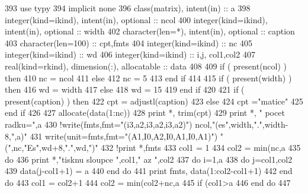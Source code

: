 \begin{DoxyCode}
393         \textcolor{keywordtype}{use }typy
394         \textcolor{keywordtype}{implicit none}
396         \textcolor{keywordtype}{class}(matrix), \textcolor{keywordtype}{intent(in)} :: a
398         \textcolor{keywordtype}{integer(kind=ikind)}, \textcolor{keywordtype}{intent(in)}, \textcolor{keywordtype}{optional} :: ncol
400         \textcolor{keywordtype}{integer(kind=ikind)}, \textcolor{keywordtype}{intent(in)}, \textcolor{keywordtype}{optional} :: width
402         \textcolor{keywordtype}{character(len=*)}, \textcolor{keywordtype}{intent(in)},    \textcolor{keywordtype}{optional} :: caption
403         \textcolor{keywordtype}{character(len=100)} :: cpt,fmts
404         \textcolor{keywordtype}{integer(kind=ikind)} :: nc
405         \textcolor{keywordtype}{integer(kind=ikind)} :: wd
406         \textcolor{keywordtype}{integer(kind=ikind)} :: i,j, col1,col2
407         \textcolor{keywordtype}{real(kind=rkind)}, \textcolor{keywordtype}{dimension(:)}, \textcolor{keywordtype}{allocatable} :: data
408 
409         \textcolor{keywordflow}{if} ( \textcolor{keyword}{present}(ncol) ) then
410         nc = ncol
411         else
412             nc = 5
413 \textcolor{keyword}{        end }if
414 
415         \textcolor{keywordflow}{if} ( \textcolor{keyword}{present}(width) ) then
416         wd = width
417         else
418             wd = 15
419 \textcolor{keyword}{        end }if
420 
421         \textcolor{keywordflow}{if} ( \textcolor{keyword}{present}(caption) ) then
422         cpt = adjustl(caption)
423         else
424             cpt =\textcolor{stringliteral}{"matice"}
425 \textcolor{keyword}{        end }if
426 
427         \textcolor{keyword}{allocate}(\textcolor{keyword}{data}(1:nc))
428         print *, trim(cpt)
429         print *, \textcolor{stringliteral}{" pocet radku="},a%
430         \textcolor{comment}{!write(fmts,fmt="(i3,a2,i3,a2,i3,a2)") ncol,"(es",width,".",width-8,",a)"
}
431         \textcolor{keyword}{write}(unit=fmts,fmt=\textcolor{stringliteral}{"(A1,I0,A2,I0,A1,I0,A1)"})   \textcolor{stringliteral}{"("},nc,\textcolor{stringliteral}{"Es"},wd+8,\textcolor{stringliteral}{"."},wd,\textcolor{stringliteral}{")"}
432         \textcolor{comment}{!print *,fmts
}
433         col1 = 1
434         col2 = min(nc,a%
435         do
436             print *,\textcolor{stringliteral}{"tisknu sloupce "},col1,\textcolor{stringliteral}{" az "},col2
437             \textcolor{keywordflow}{do} i=1,a%
438                 \textcolor{keywordflow}{do} j=col1,col2
439                     \textcolor{keyword}{data}(j-col1+1) = a%
440 \textcolor{keyword}{                end }do
441                 print fmts, \textcolor{keyword}{data}(1:col2-col1+1)
442 \textcolor{keyword}{            end }do
443             col1 = col2+1
444             col2 = min(col2+nc,a%
445             \textcolor{keywordflow}{if} (col1>a%
446 \textcolor{keyword}{        end }do
447 
\end{DoxyCode}
